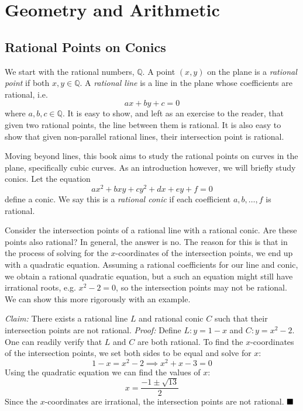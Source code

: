 \documentclass[12pt]{book}
\newcommand{\Q}{\mathbb{Q}}
\newcommand{\claim}{\textit{Claim:} }
\newcommand{\proof}{\textit{Proof:} }
\newcommand{\done}{\ensuremath{\strut\hfill\blacksquare}}
\newcommand{\proofbox}[2]{\begin{tcolorbox}[
    colback=blue!5!white,
    colframe=blue!50!black,
    adjusted title=\textbf{#1},
    before skip=0.25in,
    after skip=0.25in]
    #2
\end{tcolorbox}}
\begin{document}
    \pagestyle{fancy}

    \chapter{Geometry and Arithmetic}
    \thispagestyle{empty}
    \fancyhead[EL]{\textbf{\thepage}}
    \fancyhead[OR]{\textbf{\thepage}}
    \fancyfoot{}
    
    \section{Rational Points on Conics}

    We start with the rational numbers, $\Q$. A point $(x,y)$ on the plane is a \textit{rational point} if both $x,y\in\Q$. A \textit{rational line} is a line in the plane whose coefficients are rational, i.e.
    \[ax+by+c=0\]
    where $a,b,c\in\Q$. It is easy to show, and left as an exercise to the reader, that given two rational points, the line between them is rational. It is also easy to show that given non-parallel rational lines, their intersection point is rational.

    Moving beyond lines, this book aims to study the rational points on curves in the plane, specifically cubic curves. As an introduction however, we will briefly study conics. Let the equation
    \[ax^2+bxy+cy^2+dx+ey+f=0\]
    define a conic. We say this is a \textit{rational conic} if each coefficient $a,b,\dots,f$ is rational.
    
    Consider the intersection points of a rational line with a rational conic. Are these points also rational? In general, the answer is no. The reason for this is that in the process of solving for the $x$-coordinates of the intersection points, we end up with a quadratic equation. Assuming a rational coefficients for our line and conic, we obtain a rational quadratic equation, but a such an equation might still have irrational roots, e.g. $x^2-2=0$, so the intersection points may not be rational. We can show this more rigorously with an example.

    \proofbox{Example 1.1.1}{
        \claim There exists a rational line $L$ and rational conic $C$ such that their intersection points are not rational.
        \tcblower
        \proof Define $L:y=1-x$ and $C:y=x^2-2$. One can readily verify that $L$ and $C$ are both rational. To find the $x$-coordinates of the intersection points, we set both sides to be equal and solve for $x$:
        \[1-x=x^2-2\implies x^2+x-3=0\]
        Using the quadratic equation we can find the values of $x$:
        \[x=\frac{-1\pm\sqrt{13}}{2}\]
        Since the $x$-coordinates are irrational, the intersection points are not rational. \done
    }
\end{document}
